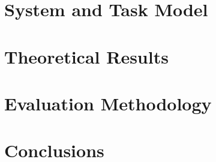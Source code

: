 \documentclass{sig-alternate-05-2015}
\begin{document}
\section{System and Task Model} \label{system_task_model}


\section{Theoretical Results} \label{theory}


\section{Evaluation Methodology} \label{results}


\section{Conclusions} \label{conclusion}



%


%

  
\end{document}
